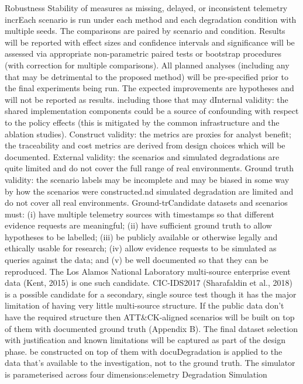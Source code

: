 \documentclass[a4paper,11pt]{article}
\begin{document}
Robustness Stability of measures as missing, delayed, or inconsistent telemetry incrEach scenario is run under each method and each degradation condition with multiple seeds. The comparisons are paired by scenario and condition. Results will be reported with effect sizes and confidence intervals and significance will be assessed via appropriate non-parametric paired tests or bootstrap procedures (with correction for multiple comparisons). All planned analyses (including any that may be detrimental to the proposed method) will be pre-specified prior to the final experiments being run. The expected improvements are hypotheses and will not be reported as results. including those that may dInternal validity: the shared implementation components could be a source of confounding with respect to the policy effects (this is mitigated by the common infrastructure and the ablation studies). Construct validity: the metrics are proxies for analyst benefit; the traceability and cost metrics are derived from design choices which will be documented. External validity: the scenarios and simulated degradations are quite limited and do not cover the full range of real environments. Ground truth validity: the scenario labels may be incomplete and may be biased in some way by how the scenarios were constructed.nd simulated degradation are limited and do not cover all real environments. Ground-trCandidate datasets and scenarios must: (i) have multiple telemetry sources with timestamps so that different evidence requests are meaningful; (ii) have sufficient ground truth to allow hypotheses to be labelled; (iii) be publicly available or otherwise legally and ethically usable for research; (iv) allow evidence requests to be simulated as queries against the data; and (v) be well documented so that they can be reproduced. The Los Alamos National Laboratory multi-source enterprise event data (Kent, 2015) is one such candidate. CIC-IDS2017 (Sharafaldin et al., 2018) is a possible candidate for a secondary, single source test though it has the major limitation of having very little multi-source structure. If the public data don't have the required structure then ATT\&CK-aligned scenarios will be built on top of them with documented ground truth (Appendix B). The final dataset selection with justification and known limitations will be captured as part of the design phase. be constructed on top of them with docuDegradation is applied to the data that's available to the investigation, not to the ground truth. The simulator is parameterised across four dimensions:elemetry Degradation Simulation\par
\end{document}
